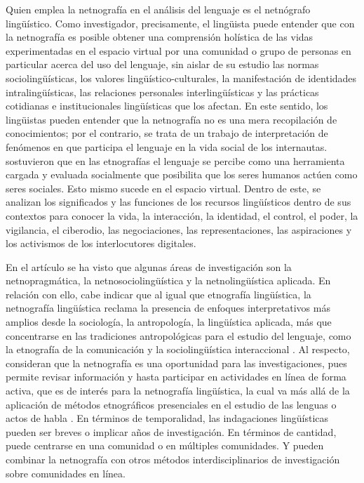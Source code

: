 Quien emplea la netnografía en el análisis del lenguaje es el netnógrafo
lingüístico. Como investigador, precisamente, el lingüista puede
entender que con la netnografía es posible obtener una comprensión
holística de las vidas experimentadas en el espacio virtual por una
comunidad o grupo de personas en particular acerca del uso del lenguaje,
sin aislar de su estudio las normas sociolingüísticas, los valores
lingüístico-culturales, la manifestación de identidades
intralingüísticas, las relaciones personales interlingüísticas y las
prácticas cotidianas e institucionales lingüísticas que los afectan. En
este sentido, los lingüistas pueden entender que la netnografía no es
una mera recopilación de conocimientos; por el contrario, se trata de un
trabajo de interpretación de fenómenos en que participa el lenguaje en
la vida social de los internautas. \textcite{Blommaert2010} sostuvieron
que en las etnografías el lenguaje se percibe como una herramienta
cargada y evaluada socialmente que posibilita que los seres humanos
actúen como seres sociales. Esto mismo sucede en el espacio virtual.
Dentro de este, se analizan los significados y las funciones de los
recursos lingüísticos dentro de sus contextos para conocer la vida, la
interacción, la identidad, el control, el poder, la vigilancia, el
ciberodio, las negociaciones, las representaciones, las aspiraciones y
los activismos de los interlocutores digitales.

En el artículo se ha visto que algunas áreas de investigación son la
netnopragmática, la netnosociolingüística y la netnolingüística
aplicada. En relación con ello, cabe indicar que al igual que etnografía
lingüística, la netnografía lingüística reclama la presencia de enfoques
interpretativos más amplios desde la sociología, la antropología, la
lingüística aplicada, más que concentrarse en las tradiciones
antropológicas para el estudio del lenguaje, como la etnografía de la
comunicación \cite{hymes1968ethnography} y la sociolingüística interaccional \cite{gumperz1972sociolinguistics}. Al respecto, \textcite{costello2017} consideran que la
netnografía es una oportunidad para las investigaciones, pues permite
revisar información y hasta participar en actividades en línea de forma
activa, que es de interés para la netnografía lingüística, la cual va
más allá de la aplicación de métodos etnográficos presenciales en el
estudio de las lenguas o actos de habla \cite{ramajo2011etnografico}. En términos de
temporalidad, las indagaciones lingüísticas pueden ser breves o implicar
años de investigación. En términos de cantidad, puede centrarse en una
comunidad o en múltiples comunidades. Y pueden combinar la netnografía
con otros métodos interdisciplinarios de investigación sobre comunidades
en línea.

